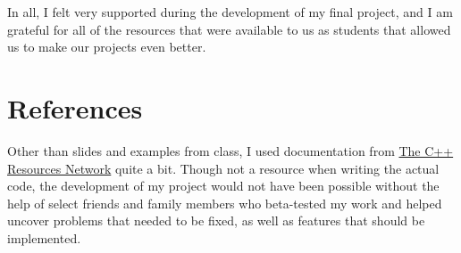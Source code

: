 \documentclass[twocolumn]{article}
\begin{document}
In all, I felt very supported during the development of my final project, and I am grateful for all of the resources that were available to us as students that allowed us to make our projects even better.

\section*{References}

Other than slides and examples from class, I used documentation from \href{http://www.cplusplus.com}{The C++ Resources Network} quite a bit. Though not a resource when writing the actual code, the development of my project would not have been possible without the help of select friends and family members who beta-tested my work and helped uncover problems that needed to be fixed, as well as features that should be implemented.
\end{document}
